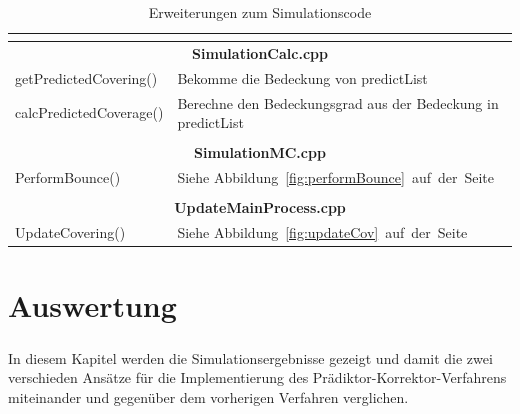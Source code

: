 \documentclass{listhesis}
\begin{document}
\begin{table}
\begin{center}
\begin{tabular}{|l|l|}
\multicolumn{2}{c}{}\\%

\hline
\multicolumn{2}{|c|}{\rule{0pt}{\vsep}\textbf{SimulationCalc.cpp}}\\
\hline
\rule{0pt}{\vsep}getPredictedCovering()&Bekomme die Bedeckung von predictList\\
\rule{0pt}{\vsep}calcPredictedCoverage()&Berechne den Bedeckungsgrad aus der Bedeckung in predictList\\
\hline

\multicolumn{2}{c}{}\\%

\hline
\multicolumn{2}{|c|}{\rule{0pt}{\vsep}\textbf{SimulationMC.cpp}}\\
\hline
\rule{0pt}{\vsep} PerformBounce()&Siehe Abbildung~\ref{fig:performBounce}~auf~der~Seite~\pageref{fig:performBounce}\\
\hline

\multicolumn{2}{c}{}\\%

\hline
\multicolumn{2}{|c|}{\rule{0pt}{\vsep}\textbf{UpdateMainProcess.cpp}}\\
\hline
\rule{0pt}{\vsep} UpdateCovering()&Siehe Abbildung~\ref{fig:updateCov}~auf~der~Seite~\pageref{fig:updateCov}\\
\hline

\end{tabular}
\end{center}
\caption{Erweiterungen zum Simulationscode}
\label{tab:all}
\end{table}

\chapter{Auswertung} \label{chap:auswertung}
\paragraph{}
In diesem Kapitel werden die Simulationsergebnisse gezeigt und damit die zwei verschieden Ansätze für die Implementierung des Prädiktor-Korrektor-Verfahrens miteinander und gegenüber dem vorherigen Verfahren verglichen.
\end{document}

